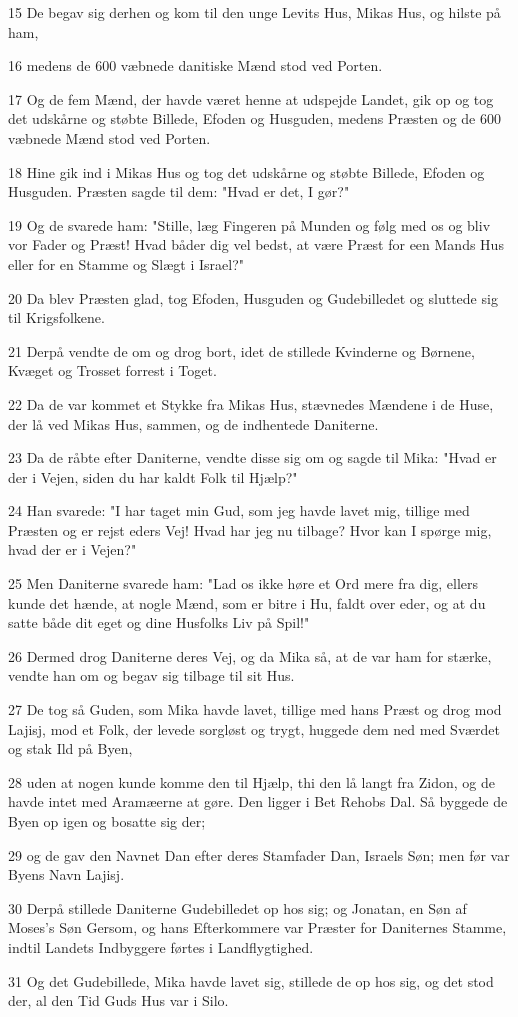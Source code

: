 \par 15 De begav sig derhen og kom til den unge Levits Hus, Mikas Hus, og hilste på ham,
\par 16 medens de 600 væbnede danitiske Mænd stod ved Porten.
\par 17 Og de fem Mænd, der havde været henne at udspejde Landet, gik op og tog det udskårne og støbte Billede, Efoden og Husguden, medens Præsten og de 600 væbnede Mænd stod ved Porten.
\par 18 Hine gik ind i Mikas Hus og tog det udskårne og støbte Billede, Efoden og Husguden. Præsten sagde til dem: "Hvad er det, I gør?"
\par 19 Og de svarede ham: "Stille, læg Fingeren på Munden og følg med os og bliv vor Fader og Præst! Hvad båder dig vel bedst, at være Præst for een Mands Hus eller for en Stamme og Slægt i Israel?"
\par 20 Da blev Præsten glad, tog Efoden, Husguden og Gudebilledet og sluttede sig til Krigsfolkene.
\par 21 Derpå vendte de om og drog bort, idet de stillede Kvinderne og Børnene, Kvæget og Trosset forrest i Toget.
\par 22 Da de var kommet et Stykke fra Mikas Hus, stævnedes Mændene i de Huse, der lå ved Mikas Hus, sammen, og de indhentede Daniterne.
\par 23 Da de råbte efter Daniterne, vendte disse sig om og sagde til Mika: "Hvad er der i Vejen, siden du har kaldt Folk til Hjælp?"
\par 24 Han svarede: "I har taget min Gud, som jeg havde lavet mig, tillige med Præsten og er rejst eders Vej! Hvad har jeg nu tilbage? Hvor kan I spørge mig, hvad der er i Vejen?"
\par 25 Men Daniterne svarede ham: "Lad os ikke høre et Ord mere fra dig, ellers kunde det hænde, at nogle Mænd, som er bitre i Hu, faldt over eder, og at du satte både dit eget og dine Husfolks Liv på Spil!"
\par 26 Dermed drog Daniterne deres Vej, og da Mika så, at de var ham for stærke, vendte han om og begav sig tilbage til sit Hus.
\par 27 De tog så Guden, som Mika havde lavet, tillige med hans Præst og drog mod Lajisj, mod et Folk, der levede sorgløst og trygt, huggede dem ned med Sværdet og stak Ild på Byen,
\par 28 uden at nogen kunde komme den til Hjælp, thi den lå langt fra Zidon, og de havde intet med Aramæerne at gøre. Den ligger i Bet Rehobs Dal. Så byggede de Byen op igen og bosatte sig der;
\par 29 og de gav den Navnet Dan efter deres Stamfader Dan, Israels Søn; men før var Byens Navn Lajisj.
\par 30 Derpå stillede Daniterne Gudebilledet op hos sig; og Jonatan, en Søn af Moses's Søn Gersom, og hans Efterkommere var Præster for Daniternes Stamme, indtil Landets Indbyggere førtes i Landflygtighed.
\par 31 Og det Gudebillede, Mika havde lavet sig, stillede de op hos sig, og det stod der, al den Tid Guds Hus var i Silo.

